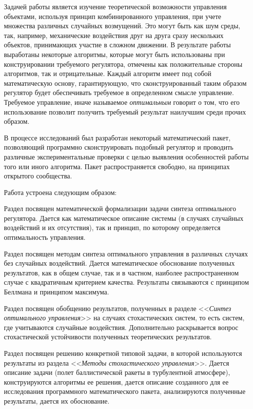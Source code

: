 Задачей работы является изучение теоретической возможности управления объектами, используя принцип комбинированного управления, при учете множества различных случайных возмущений. Это могут быть как шум среды, так, например, механические воздействия друг на друга сразу нескольких объектов, принимающих участие в сложном движении. В результате работы выработаны некоторые алгоритмы, которые могут быть использованы при конструировании требуемого регулятора, отмечены как положительные стороны алгоритмов, так и отрицательные. Каждый алгоритм имеет под собой математическую основу, гарантирующую, что сконструированный таким образом регулятор будет обеспечивать требуемое в определенном смысле управление. Требуемое управление, иначе называемое \emph{оптимальным} говорит о том, что его использование позволит получить требуемый результат наилучшим среди прочих образом.

В процессе исследований был разработан некоторый математический пакет, позволяющий программно сконструировать подобный регулятор и проводить различные экспериментальные проверки с целью выявления особенностей работы того или иного алгоритма. Пакет распространяется свободно, на принципах открытого сообщества.

\br

Работа устроена следующим образом:

\bdescr
    \item[Постановка задачи.]
        Раздел посвящен математической формализации задачи синтеза оптимального регулятора. Дается как математическое описание системы (в случаях случайных воздействий и их отсутствия), так и принцип, по которому определяется оптимальность управления.

    \item[Синтез оптимального управления.]
        Раздел посвящен методам синтеза оптимального управления в различных случаях без случайных воздействий. Дается математическое обоснование полученных результатов, как в общем случае, так и в частном, наиболее распространенном случае с квадратичным критерием качества. Результаты связываются с принципом Беллмана и принципом максимума.

    \item[Методы стохастического управления.]
        Раздел посвящен обобщению результатов, полученных в разделе <<\emph{Синтез оптимального управления}>> на случаях стохастических систем, то есть систем, где учитываются случайные воздействия. Дополнительно раскрывается вопрос стохастической устойчивости полученных теоретических результатов.

    \item[Пример решения типовой задачи.]
        Раздел посвящен решению конкретной типовой задачи, в которой используются результаты из раздела <<\emph{Методы стохастического управления}>>. Дается описание задачи (полет баллистической ракеты в турбулентной атмосфере), конструируются алгоритмы ее решения, дается описание созданного для ее исследования программного математического пакета, анализируются полученные результаты, дается их обоснование.
\edescr

